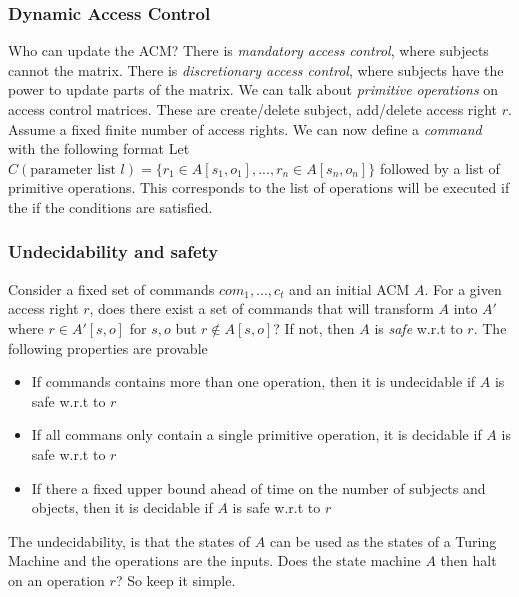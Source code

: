 \documentclass[14pt]{beamer}
\begin{document}
        \begin{frame}
            \frametitle{Dynamic Access Control}
                Who can update the ACM? There is \textit{mandatory access control}, where subjects cannot the matrix. There is \textit{discretionary access control}, where subjects have the power to update parts of the matrix. 
                We can talk about \textit{primitive operations} on access control matrices. These are create/delete subject, add/delete access right $r$. Assume a fixed finite number of access rights. We can now define a \textit{command} with the following format
                Let $C(\text{parameter list } l) = \{r_1 \in A[s_1, o_1], ... , r_n \in A[s_n, o_n]\}$ followed by a list of primitive operations. This corresponds to the list of operations will be executed if the if the conditions are satisfied. 
        \end{frame}
        \begin{frame}
            \frametitle{Undecidability and safety}
                Consider a fixed set of commands $com_1, ..., c_t$ and an initial ACM $A$. For a given access right $r$, does there exist a set of commands that will transform $A$ into $A'$ where $r \in A'[s, o]$ for $s, o$ but $r \notin A[s, o]$? If not, then $A$ is \textit{safe} w.r.t to $r$. 
                The following properties are provable
                    \begin{itemize}
                        \item If commands contains more than one operation, then it is undecidable if $A$ is safe w.r.t to $r$
                        \item If all commans only contain a single primitive operation, it is decidable if $A$ is safe w.r.t to $r$
                        \item If there a fixed upper bound ahead of time on the number of subjects and objects, then it is decidable if $A$ is safe w.r.t to $r$    
                    \end{itemize}
                    The undecidability, is that the states of $A$ can be used as the states of a Turing Machine and the operations are the inputs. Does the state machine $A$ then halt on an operation $r$? So keep it simple. 
        \end{frame}
\end{document}
